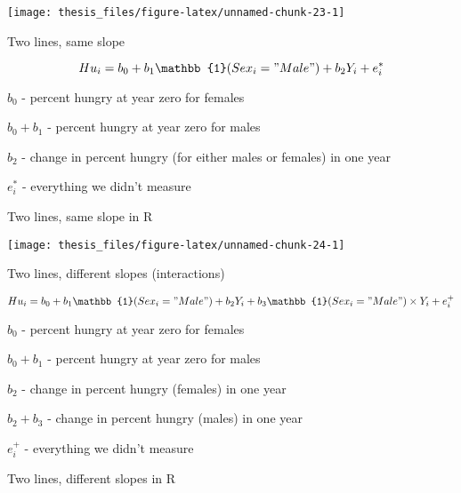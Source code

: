 \documentclass[12pt,openright,oneside,a4paper,chapter=TITLE,section=TITLE,subsection=Title,english,french,spanish,portugues,sumario=tradicional]{04-class-files/abntex2}
\newenvironment{Shaded}{\begin{snugshade}}{\end{snugshade}}
\newcommand{\DataTypeTok}[1]{\textcolor[rgb]{0.13,0.29,0.53}{#1}}
\newcommand{\DecValTok}[1]{\textcolor[rgb]{0.00,0.00,0.81}{#1}}
\newcommand{\KeywordTok}[1]{\textcolor[rgb]{0.13,0.29,0.53}{\textbf{#1}}}
\newcommand{\NormalTok}[1]{#1}
\newcommand{\OperatorTok}[1]{\textcolor[rgb]{0.81,0.36,0.00}{\textbf{#1}}}
\newcommand{\StringTok}[1]{\textcolor[rgb]{0.31,0.60,0.02}{#1}}
\begin{document}
\begin{center}\texttt{[image: thesis\_files/figure-latex/unnamed-chunk-23-1]} \end{center}

Two lines, same slope

\[Hu_i = b_0 + b_1 \mathbb{1}(Sex_i="Male") + b_2 Y_i + e^*_i\]

\(b_0\) - percent hungry at year zero for females

\(b_0 + b_1\) - percent hungry at year zero for males

\(b_2\) - change in percent hungry (for either males or females) in one year

\(e^*_i\) - everything we didn't measure

Two lines, same slope in R

\begin{Shaded}
\end{Shaded}

\begin{center}\texttt{[image: thesis\_files/figure-latex/unnamed-chunk-24-1]} \end{center}

Two lines, different slopes (interactions)

\[Hu_i = b_0 + b_1 \mathbb{1}(Sex_i="Male") + b_2 Y_i + b_3 \mathbb{1}(Sex_i="Male")\times Y_i + e^+_i\]

\(b_0\) - percent hungry at year zero for females

\(b_0 + b_1\) - percent hungry at year zero for males

\(b_2\) - change in percent hungry (females) in one year

\(b_2 + b_3\) - change in percent hungry (males) in one year

\(e^+_i\) - everything we didn't measure

Two lines, different slopes in R

\begin{Shaded}
\end{Shaded}
\end{document}
